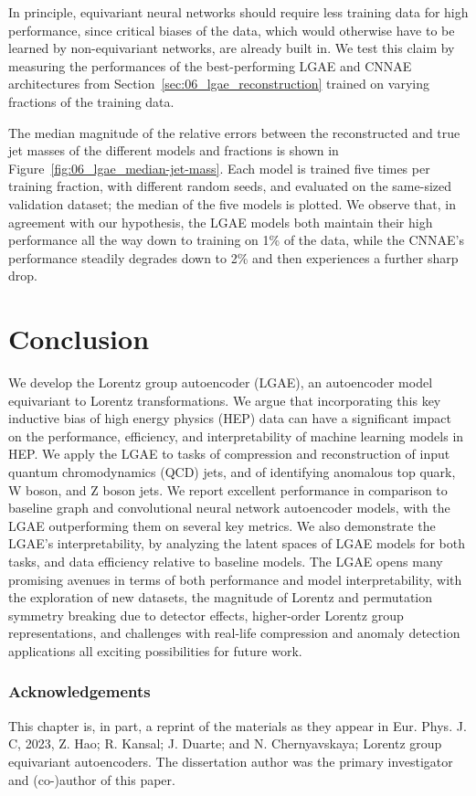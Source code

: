 In principle, equivariant neural networks should require less training data for high performance, since critical biases of the data, which would otherwise have to be learned by non-equivariant networks, are already built in.
We test this claim by measuring the performances of the best-performing LGAE and CNNAE architectures from Section~\ref{sec:06_lgae_reconstruction} trained on varying fractions of the training data.

The median magnitude of the relative errors between the reconstructed and true jet masses of the different models and fractions is shown in Figure~\ref{fig:06_lgae_median-jet-mass}.
Each model is trained five times per training fraction, with different random seeds, and evaluated on the same-sized validation dataset; the median of the five models is plotted.
We observe that, in agreement with our hypothesis, the LGAE models both maintain their high performance all the way down to training on 1\% of the data, while the CNNAE's performance steadily degrades down to 2\% and then experiences a further sharp drop.


\section{Conclusion}
\label{sec:06_lgae_conclusion}

We develop the Lorentz group autoencoder (LGAE), an autoencoder model equivariant to Lorentz transformations.
We argue that incorporating this key inductive bias of high energy physics (HEP) data can have a significant impact on the performance, efficiency, and interpretability of machine learning models in HEP.
We apply the LGAE to tasks of compression and reconstruction of input quantum chromodynamics (QCD) jets, and of identifying anomalous top quark, W boson, and Z boson jets.
We report excellent performance in comparison to baseline graph and convolutional neural network autoencoder models, with the LGAE outperforming them on several key metrics.
We also demonstrate the LGAE's interpretability, by analyzing the latent spaces of LGAE models for both tasks, and data efficiency relative to baseline models.
The LGAE opens many promising avenues in terms of both performance and model interpretability, with the exploration of new datasets, the magnitude of Lorentz and permutation symmetry breaking due to detector effects, higher-order Lorentz group representations, and challenges with real-life compression and anomaly detection applications all exciting possibilities for future work.

\subsubsection{Acknowledgements}

This chapter is, in part, a reprint of the materials as they appear in
Eur. Phys. J. C, 2023, Z. Hao; R. Kansal; J. Duarte; and N. Chernyavskaya; Lorentz group equivariant autoencoders.
The dissertation author was the primary investigator and (co-)author of this paper.

